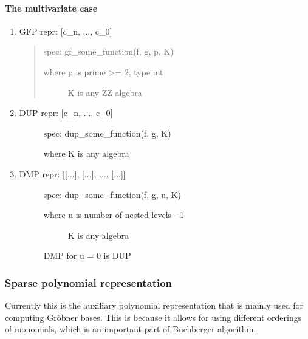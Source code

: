 \paragraph{The multivariate case}
\begin{enumerate}
\item {}
GFP repr: {[}c\_n, ..., c\_0{]}
\begin{quote}

spec: gf\_some\_function(f, g, p, K)
\begin{description}
\item[where p is prime \textgreater{}= 2, type int] \leavevmode
K is any ZZ algebra

\end{description}
\end{quote}

\item {} \begin{description}
\item[DUP repr: {[}c\_n, ..., c\_0{]}] \leavevmode
spec: dup\_some\_function(f, g, K)

where K is any algebra

\end{description}

\item {} \begin{description}
\item[DMP repr: {[}{[}...{]}, {[}...{]}, ..., {[}...{]}{]}] \leavevmode
spec: dup\_some\_function(f, g, u, K)
\begin{description}
\item[where u is number of nested levels - 1] \leavevmode
K is any algebra

\end{description}

DMP for u = 0 is DUP

\end{description}

\end{enumerate}


\subsubsection{Sparse polynomial representation}

Currently this is the auxiliary polynomial representation that is mainly used for computing
Gröbner bases. This is because it allows for using different orderings of monomials, which
is an important part of Buchberger algorithm.


